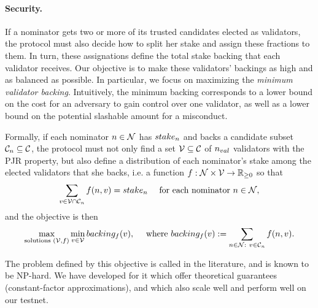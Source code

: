 \paragraph{Security.} If a nominator gets two or more of its trusted candidates elected as validators,
the protocol must also decide how to split her stake and assign these fractions to them.
In turn, these assignations define the total stake backing that each validator receives.
Our objective is to make these validators' backings as high and as balanced as possible.
In particular, we focus on maximizing the \emph{minimum validator backing}.
Intuitively, the minimum backing corresponds to a lower bound on the cost for an adversary to gain control
over one validator, as well as a lower bound on the potential slashable amount for a misconduct.

Formally, if each nominator $n \in \mathcal{N}$ has $stake_{n}$ and backs a candidate subset $\mathcal{C}_{n}\subseteq \mathcal{C}$,
the protocol must not only find a set $\mathcal{V}\subseteq \mathcal{C}$ of $n_{val}$ validators
with the PJR property, but also define a distribution of each nominator's stake among the elected validators that she backs,
i.e. a function $f:\mathcal{N}\times\mathcal{V} \rightarrow \mathbb{R}_{\geq 0}$ so that
$$\sum_{v\in \mathcal{V}\cap \mathcal{C}_{n}} f(n, v) = stake_{n} \quad \text{ for each nominator } n\in\mathcal{N},$$
and the objective is then
$$\max_{\text{solutions } (\mathcal{V}, f)} \min_{v\in \mathcal{V}} backing_f(v),
\quad \text{ where } backing_f(v) := \sum_{n\in \mathcal{N}: \ v\in \mathcal{C}_{n}} f(n, v). $$

The problem defined by this objective is called  in the literature, and is known to be NP-hard.
We have developed for it  which offer theoretical guarantees
(constant-factor approximations), and which also scale well and perform well on our testnet.

